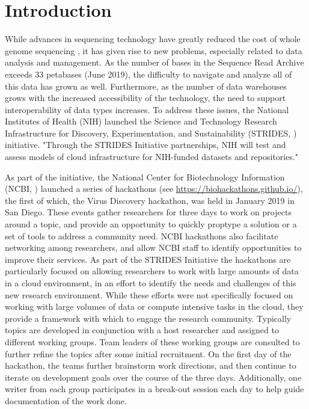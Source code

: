 \documentclass[genes, moreauthors]{Definitions/mdpi}
\begin{document}
  \section{Introduction}
  While advances in sequencing technology have greatly reduced the cost of
  whole genome sequencing \cite{Mardis2011}, it has given rise to new problems,
  especially related to data analysis and management. As the number of bases in
  the Sequence Read Archive \cite{Kodama2012} exceeds 33 petabases (June 2019),
  the difficulty to navigate and analyze all of this data has grown as well.
  Furthermore, as the number of data warehouses grows with the increased
  accessibility of the technology, the need to support interoperability of data
  types increases. To address these issues, the National Institutes of Health
  (NIH) launched the Science and Technology Research Infrastructure for
  Discovery, Experimentation, and Sustainability (STRIDES, \cite{StridesWeb})
  initiative. "Through the STRIDES Initiative partnerships, NIH will test and
  assess models of cloud infrastructure for NIH-funded datasets and
  repositories."

  As part of the initiative, the National Center for Biotechnology Information
  (NCBI, \cite{Sayers2019}) launched a series of hackathons (see
  \url{https://biohackathons.github.io/}), the first of which, the Virus Discovery
  hackathon, was held in January 2019 in San Diego. These events gather
  researchers for three days to work on projects around a topic, and provide an
  opportunity to quickly proptype a solution or a set of tools to address a
  community need. NCBI hackathons also facilitate networking among researchers,
  and allow NCBI staff to identify opportunities to improve their services. As
  part of the STRIDES Initiative the hackathons are particularly focused on
  allowing researchers to work with large amounts of data in a cloud
  environment, in an effort to identify the needs and challenges of this new
  research environment. While these efforts were not specifically focused on
  working with large volumes of data or compute intensive tasks in the cloud,
  they provide a framework with which to engage the research community.
  Typically topics are developed in conjunction with a host researcher and
  assigned to different working groups. Team leaders of these working groups
  are consulted to further refine the topics after some initial recruitment. On
  the first day of the hackathon, the teams further brainstorm work directions,
  and then continue to iterate on development goals over the course of the
  three days. Additionally, one writer from each group participates in a
  break-out session each day to help guide documentation of the work done.
\end{document}
